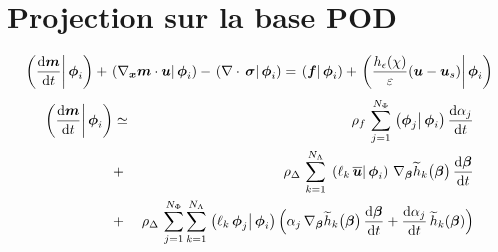 \documentclass[10pt,a4paper]{article}
\begin{document}
%
\section{Projection sur la base POD}
%
\begin{equation}
 \left.\left(\frac{\mathrm{d} \boldsymbol{m}}{\mathrm{d} t}\right\vert \boldsymbol{\phi}_i\right) +   \left.\left(\nabla_{\boldsymbol{x}}\boldsymbol{m} \cdot \boldsymbol{u} \right\vert \boldsymbol{\phi}_i\right) -\left.\left(\nabla\cdot \,\boldsymbol{\sigma}\right\vert \boldsymbol{\phi}_i\right) =  \left.\left(\boldsymbol{f}\right\vert \boldsymbol{\phi}_i\right) + \left.\left(\frac{h_{\epsilon}(\chi)}{\varepsilon}(\boldsymbol{u}-\boldsymbol{u}_{s})\right\vert \boldsymbol{\phi}_i\right)
\end{equation}
%
\begin{eqnarray}
\label{eq:dtm_phii}
 \prodscal{\dt{\vec m}}{\vphi_i} & \simeq &  
\rho_f \, \sum_{j=1}^{N_\Phi} \prodscal{\vphi_j}{\vphi_i}\dt{\alpha_j} \\
&+& \rho_\Delta\,\sum_{k=1}^{N_\Lambda}\,  \prodscal{\ell_k \, \bu}{\vphi_i}\, \grad_{\vec \beta}\th_k \big(\vec \beta\big)\,\dt{\vec \beta}\\
&+& \rho_\Delta\,\sum_{j=1}^{N_\Phi} \sum_{k=1}^{N_\Lambda}  \prodscal{\ell_k\,\vphi_j}{\vphi_i} \Big(\alpha_j \,  \grad_{\vec \beta}\th_k \big(\vec \beta\big)\,\dt{\vec \beta}+ \dt{\alpha_j}\, \th_k(\vec \beta)\Big) 
\end{eqnarray}
\end{document}
